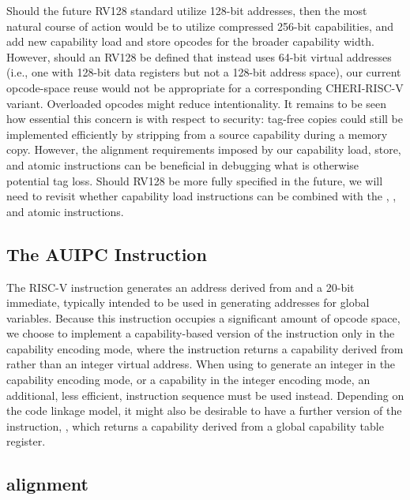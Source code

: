 Should the future RV128 standard utilize 128-bit addresses, then the most
natural course of action would be to utilize compressed 256-bit capabilities,
and add new capability load and store opcodes for the broader capability
width.
However, should an RV128 be defined that instead uses 64-bit virtual
addresses (i.e., one with 128-bit data registers but not a 128-bit address
space), our current opcode-space reuse would not be appropriate for a
corresponding CHERI-RISC-V variant.
Overloaded opcodes might reduce intentionality.
It remains to be seen how essential this
concern is with respect to security: tag-free copies could still be
implemented efficiently by stripping \cappermLC{} from a source
capability during a memory copy.
However, the alignment requirements imposed by our capability load, store,
and atomic instructions can be beneficial in debugging what is otherwise
potential tag loss.
Should RV128 be more fully specified in the future, we will need to revisit
whether capability load instructions can be combined with the
, , and atomic instructions.

\subsection{The AUIPC Instruction}
\label{section:cheri-risc-v-auipc}

The RISC-V  instruction generates an address derived
from \PC{} and a 20-bit immediate, typically intended to be used in generating
addresses for global variables.
Because this instruction occupies a significant amount of opcode space, we
choose to implement a capability-based version of the instruction only in the
capability encoding mode, where the instruction returns a capability derived
from \PCC{} rather than an integer virtual address.
When using  to generate an integer in the capability
encoding mode, or a capability in the integer encoding mode, an additional,
less efficient, instruction sequence must be used instead.
Depending on the code linkage model, it might also be desirable to have a
further version of the instruction, , which returns
a capability derived from a global capability table register.

\subsection{\PCC{} alignment}
\label{section:cheri-risc-v-pcc-align}

